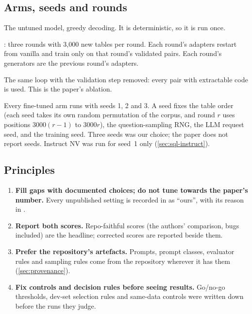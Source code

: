 \subsection{Arms, seeds and rounds}

\begin{description}[style=nextline,leftmargin=1.2em]
\item[Vanilla.] The untuned model, greedy decoding. It is deterministic, so it is run once.
\item[Table-Specialist (TS).] : three rounds with 3,000 new tables per round. Each round's
adapters restart from vanilla and train only on that round's validated pairs. Each round's generators are the previous
round's adapters.
\item[No-validation (NV).] The same loop with the validation step removed: every pair with extractable code is used.
This is the paper's ablation.
\end{description}

Every fine-tuned arm runs with seeds 1, 2 and 3. A seed fixes the table order (each seed takes its own random
permutation of the corpus, and round $r$ uses positions $3000(r-1)$ to $3000r$), the question-sampling RNG, the LLM
request seed, and the training seed. Three seeds was our choice; the paper does not report seeds. Instruct NV was run
for seed~1 only (\cref{sec:sql-instruct}).

\subsection{Principles}

\begin{enumerate}
\item \textbf{Fill gaps with documented choices; do not tune towards the paper's number.} Every unpublished setting is
recorded in  as ``ours'', with its reason in .
\item \textbf{Report both scores.} Repo-faithful scores (the authors' comparison, bugs included) are the headline;
corrected scores are reported beside them.
\item \textbf{Prefer the repository's artefacts.} Prompts, prompt classes, evaluator rules and sampling rules come
from the repository wherever it has them (\cref{sec:provenance}).
\item \textbf{Fix controls and decision rules before seeing results.} Go/no-go thresholds, dev-set selection rules and
same-data controls were written down before the runs they judge.
\end{enumerate}

